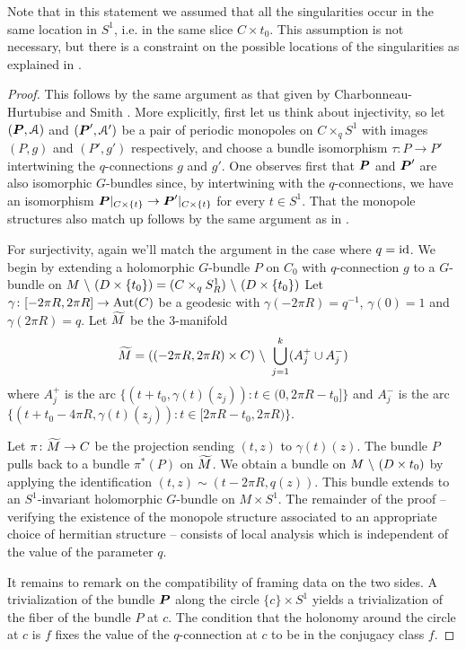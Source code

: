 \documentclass[10pt, oneside]{article}
\begin{document}
\begin{remark}
Note that in this statement we assumed that all the singularities occur in the same location in $S^1$, i.e. in the same slice $C \times {t_0}$.  This assumption is not necessary, but there is a constraint on the possible locations of the singularities as explained in \cite[Proposition 3.5]{CharbonneauHurtubise}.  
\end{remark}

\begin{proof}
This follows by the same argument as that given by Charbonneau-Hurtubise \cite{CharbonneauHurtubise} and Smith \cite{Smith}.  More explicitly, first let us think about injectivity, so let $(\boldsymbol{P}, \mathcal{A})$ and $(\boldsymbol{P}', \mathcal{A}')$ be a pair of periodic monopoles on $C \times_q S^1$ with images $(P,g)$ and $(P', g')$ respectively, and choose a bundle isomorphism $\tau \colon P \to P'$ intertwining the $q$-connections $g$ and $g'$.  One observes first that $\boldsymbol{P}$ and $\boldsymbol{P}'$ are also isomorphic $G$-bundles since, by intertwining with the $q$-connections, we have an isomorphism $\boldsymbol{P}|_{C \times \{t\}} \to \boldsymbol{P}'|_{C \times \{t\}}$ for every $t \in S^1$.  That the monopole structures also match up follows by the same argument as in \cite[Proposition 4.7]{CharbonneauHurtubise}.

For surjectivity, again we'll match the argument in the case where $q=\operatorname{id}$.  We begin by extending a holomorphic $G$-bundle $P$ on $C_0$ with $q$-connection $g$ to a $G$-bundle on $M \ \backslash \  (D \times \{t_0\}) = (C \times_q S^1_R) \ \backslash \  (D \times \{t_0\})$  Let $\gamma \colon [-2\pi R,2\pi R] \to \operatorname{Aut}(C)$ be a geodesic with $\gamma(-2\pi R) = q^{-1}$, $\gamma(0)=1$ and $\gamma(2\pi R) = q$.  Let $\widetilde{M}$ be the 3-manifold
\[\widetilde{M} = ((-2\pi R, 2\pi R) \times C) \ \backslash \  \bigcup_{j=1}^k (A^+_j \cup A^-_j)\]
where $A^+_j$ is the arc $\{(t+ t_0,\gamma(t)(z_j)) \colon t \in (0, 2\pi R - t_0]\}$ and $A^-_j$ is the arc $\{(t + t_0 - 4 \pi R,\gamma(t)(z_j)) \colon t \in [2\pi R-t_0, 2 \pi R)\}$.

Let $\pi \colon \widetilde{M} \to C$ be the projection sending $(t,z)$ to $\gamma(t)(z)$.  The bundle $P$ pulls back to a bundle $\pi^*(P)$ on $\widetilde{M}$.  We obtain a bundle on $M \ \backslash \  (D \times t_0)$ by applying the identification $(t,z) \sim (t - 2 \pi R, q(z))$.  This bundle extends to an $S^1$-invariant holomorphic $G$-bundle on $M \times S^1$.  The remainder of the proof -- verifying the existence of the monopole structure associated to an appropriate choice of hermitian structure -- consists of local analysis which is independent of the value of the parameter $q$. 

It remains to remark on the compatibility of framing data on the two sides.  A trivialization of the bundle $\boldsymbol{P}$ along the circle $\{c\} \times S^1$ yields a trivialization of the fiber of the bundle $P$ at $c$.  The condition that the holonomy around the circle at $c$ is $f$ fixes the value of the $q$-connection at $c$ to be in the conjugacy class $f$.
\end{proof}
\end{document}
